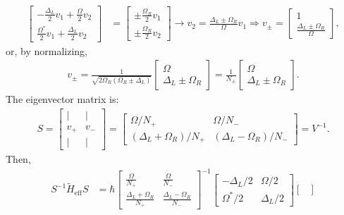 \documentclass[letterpaper,11pt,twoside]{article}
\begin{document}
\begin{enumerate}[itemsep=0pt,topsep=0pt,parsep=0pt,label=\alph*)]
\begin{align*}
    \begin{bmatrix}
      -\frac{\Delta_L}{2}v_1+\frac{\Omega}{2}v_2\\
      \frac{\Omega^*}{2}v_1+\frac{\Delta_L}{2}v_2
    \end{bmatrix}&=\begin{bmatrix}
      \pm\frac{\Omega_R}{2}v_1\\\pm\frac{\Omega_R}{2}v_2
    \end{bmatrix}\longrightarrow v_2=\frac{\Delta_L\pm\Omega_R}{\Omega}v_1\Longrightarrow v_\pm=\begin{bmatrix}
      1\\\frac{\Delta_L\pm\Omega_R}{\Omega}
    \end{bmatrix},
  \end{align*}
  or, by normalizing,
  \begin{align*}
    v_\pm=\frac{1}{\sqrt{2\Omega_R(\Omega_R\pm\Delta_L)}}\begin{bmatrix}
        \Omega\\\Delta_L\pm\Omega_R
      \end{bmatrix}=\frac{1}{N_\pm}\begin{bmatrix}
        \Omega\\\Delta_L\pm\Omega_R
      \end{bmatrix}.
  \end{align*}
  The eigenvector matrix is:
  \begin{align*}
    S=\begin{bmatrix}
      |&|\\
      v_+&v_-\\
      |&|
    \end{bmatrix}=\begin{bmatrix}
      \Omega/N_+&\Omega/N_-\\
      (\Delta_L+\Omega_R)/N_+&(\Delta_L-\Omega_R)/N_-
    \end{bmatrix}=V^{-1}.
  \end{align*}
  Then,
  \begin{align*}
    S^{-1}\tilde{H}_{\mathrm{eff}}S&=\hbar\begin{bmatrix}
      \frac{\Omega}{N_+}&\frac{\Omega}{N_-}\\
      \frac{\Delta_L+\Omega_R}{N_+}&\frac{\Delta_L-\Omega_R}{N_-}
    \end{bmatrix}^{-1}\begin{bmatrix}
      -\Delta_L/2&\Omega/2\\\Omega^*/2&\Delta_L/2
    \end{bmatrix}\begin{bmatrix}

\end{bmatrix}
\end{align*}
\end{enumerate}
\end{document}
